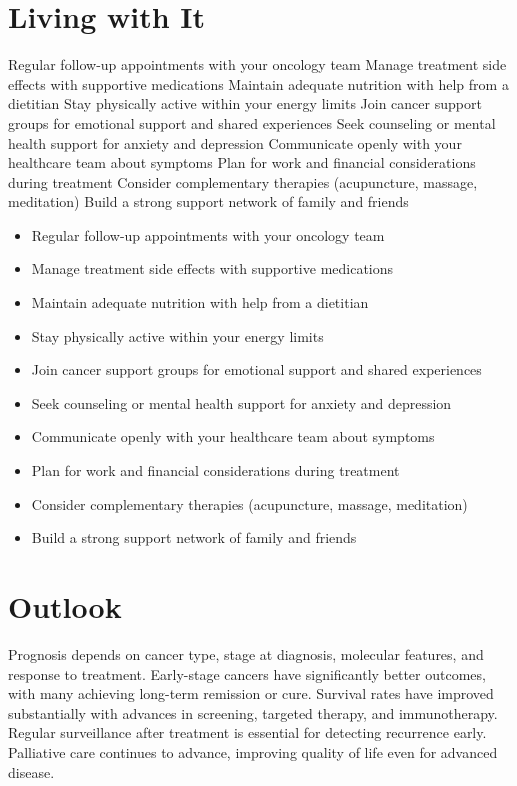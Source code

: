 \section{Living with It}
Regular follow-up appointments with your oncology team Manage treatment side effects with supportive medications Maintain adequate nutrition with help from a dietitian Stay physically active within your energy limits Join cancer support groups for emotional support and shared experiences Seek counseling or mental health support for anxiety and depression Communicate openly with your healthcare team about symptoms Plan for work and financial considerations during treatment Consider complementary therapies (acupuncture, massage, meditation) Build a strong support network of family and friends

\begin{itemize}[noitemsep]
  \item Regular follow-up appointments with your oncology team
  \item Manage treatment side effects with supportive medications
  \item Maintain adequate nutrition with help from a dietitian
  \item Stay physically active within your energy limits
  \item Join cancer support groups for emotional support and shared experiences
  \item Seek counseling or mental health support for anxiety and depression
  \item Communicate openly with your healthcare team about symptoms
  \item Plan for work and financial considerations during treatment
  \item Consider complementary therapies (acupuncture, massage, meditation)
  \item Build a strong support network of family and friends
\end{itemize}
\section{Outlook}
Prognosis depends on cancer type, stage at diagnosis, molecular features, and response to treatment. Early-stage cancers have significantly better outcomes, with many achieving long-term remission or cure. Survival rates have improved substantially with advances in screening, targeted therapy, and immunotherapy. Regular surveillance after treatment is essential for detecting recurrence early. Palliative care continues to advance, improving quality of life even for advanced disease.
